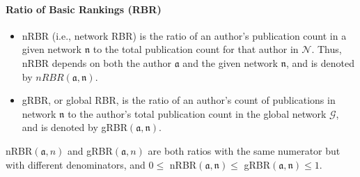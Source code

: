 \documentclass[12pt]{amsart}
\begin{document}
\paragraph{\textbf {Ratio of Basic Rankings (RBR)}}
\begin{itemize}
\item nRBR (i.e., network RBR) is the ratio of an author's publication count in a given network $\mathfrak{n}$ to the total publication count for that author  in $\mathcal{N}$.
 Thus, nRBR depends on both the author $\mathfrak{a}$ and the given network $\mathfrak{n}$, and is denoted by $nRBR(\mathfrak{a},\mathfrak{n})$.
\item gRBR, or global RBR, is the ratio of an author's count of publications in network $\mathfrak{n}$ to the author's total publication count in the global network $\mathcal{G}$,
and is denoted by gRBR$(\mathfrak{a},\mathfrak{n})$. 
\end{itemize}
\noindent
nRBR$(\mathfrak{a},n)$ and gRBR$(\mathfrak{a},n)$ are both ratios with the same numerator but with different denominators, and  
$0 \leq$ nRBR$(\mathfrak{a},\mathfrak{n}) \leq$ gRBR$(\mathfrak{a},\mathfrak{n}) \leq 1$.
\end{document}

